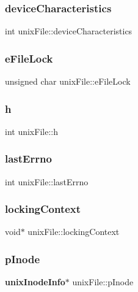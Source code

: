\subsubsection{deviceCharacteristics}
{\footnotesize\ttfamily int unix\+File\+::device\+Characteristics}

\mbox{\label{structunix_file_a001e59bdb9d3f396952c2c8e3229f7fc}} 
\subsubsection{eFileLock}
{\footnotesize\ttfamily unsigned char unix\+File\+::e\+File\+Lock}

\mbox{\label{structunix_file_a1c58798d4ff3ac6232765c8b76bb7450}} 
\subsubsection{h}
{\footnotesize\ttfamily int unix\+File\+::h}

\mbox{\label{structunix_file_afde57c2e118fac8041918dac2ee6f7d1}} 
\subsubsection{lastErrno}
{\footnotesize\ttfamily int unix\+File\+::last\+Errno}

\mbox{\label{structunix_file_afaeb4425a6de3e913db4b03e8a0d098a}} 
\subsubsection{lockingContext}
{\footnotesize\ttfamily void$\ast$ unix\+File\+::locking\+Context}

\mbox{\label{structunix_file_ac17292fe29bb6cc9eceed9db6d1209e8}} 
\subsubsection{pInode}
{\footnotesize\ttfamily \textbf{ unix\+Inode\+Info}$\ast$ unix\+File\+::p\+Inode}

\mbox{\label{structunix_file_a2a2b40e965f91aa9ee21135bfb0c17ec}} 
